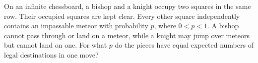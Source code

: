On an infinite chessboard, a bishop and a knight occupy two squares in the same row. Their occupied squares are kept clear. Every other square independently contains an impassable meteor with probability $p$, where $0<p<1$. A bishop cannot pass through or land on a meteor, while a knight may jump over meteors but cannot land on one. For what $p$ do the pieces have equal expected numbers of legal destinations in one move?
